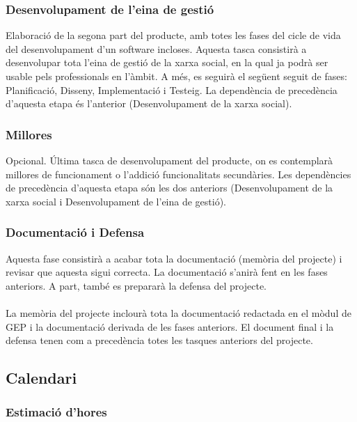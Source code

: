\documentclass[11pt,catalan,listoffigures,listoftables]{tfgetsinf}
\begin{document}
\subsubsection{Desenvolupament de l’eina de gestió}
Elaboració de la segona part del producte, amb totes les fases del cicle de vida del desenvolupament d’un software incloses. Aquesta tasca consistirà a desenvolupar tota l’eina de gestió de la xarxa social, en la qual ja podrà ser usable pels professionals en l’àmbit. A més, es seguirà el següent seguit de fases: Planificació, Disseny, Implementació i Testeig. La dependència de precedència d’aquesta etapa és l’anterior (Desenvolupament de la xarxa social).

\subsubsection{Millores}
Opcional. Última tasca de desenvolupament del producte, on es contemplarà millores de funcionament o l’addició funcionalitats secundàries. Les dependències de precedència d’aquesta etapa són les dos anteriors (Desenvolupament de la xarxa social i Desenvolupament de l’eina de gestió).

\subsubsection{Documentació i Defensa}
Aquesta fase consistirà a acabar tota la documentació (memòria del projecte) i revisar que aquesta sigui correcta. La documentació s’anirà fent en les fases anteriors. A part, també es prepararà la defensa del projecte.\\ \\
La memòria del projecte inclourà tota la documentació redactada en el mòdul de GEP i la documentació derivada de les fases anteriors. El document final i la defensa tenen com a precedència totes les tasques anteriors del projecte.

\subsection{Calendari}

\subsubsection{Estimació d'hores}
\end{document}
